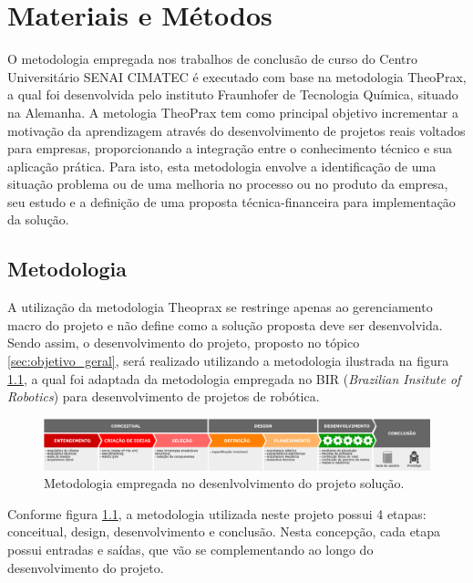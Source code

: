 \chapter{Materiais e Métodos}
\label{chap:materiais_metodos}
O metodologia empregada nos trabalhos de conclusão de curso do Centro Universitário SENAI CIMATEC é executado com base na metodologia TheoPrax, a qual foi desenvolvida pelo instituto Fraunhofer de Tecnologia Química, situado na Alemanha. A metologia TheoPrax tem como principal objetivo incrementar a motivação da aprendizagem através do desenvolvimento de projetos reais voltados para empresas, proporcionando a integração entre o conhecimento técnico e sua aplicação prática. Para isto, esta  metodologia envolve a identificação de uma situação problema ou de uma melhoria no processo ou no produto da empresa, seu estudo e a definição de uma proposta técnica-financeira para implementação da solução.

\section{Metodologia}
\label{sec:metodologia}
A utilização da metodologia Theoprax se restringe apenas ao gerenciamento macro do projeto e não define como a solução proposta deve ser desenvolvida. Sendo assim, o desenvolvimento do projeto, proposto no tópico \ref{sec:objetivo_geral}, será realizado utilizando a metodologia ilustrada na figura \ref{fig:metodologia_diagrama}, a qual foi adaptada da metodologia empregada no BIR (\textit{Brazilian Insitute of Robotics}) para desenvolvimento de projetos de robótica.

\begin{figure}[H]
	\label{fig:metodologia_diagrama}
	\centering
	\caption{Metodologia empregada no desenlvolvimento do projeto solução.}
	\includegraphics[width=1\textwidth]
	{Figures/metodologia_diagrama}
\end{figure}	

Conforme figura \ref{fig:metodologia_diagrama}, a metodologia utilizada neste projeto possui 4 etapas: conceitual, design, desenvolvimento e conclusão. Nesta concepção, cada etapa possui entradas e saídas, que vão se complementando ao longo do desenvolvimento do projeto.

